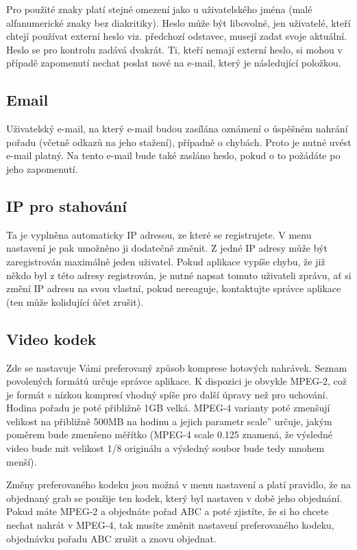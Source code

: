 Pro použité znaky platí stejné omezení jako u uživatelského jména (malé alfanumerické znaky bez diakritiky). Heslo může být libovolné, jen uživatelé, kteří chtejí používat externí heslo viz. předchozí odstavec, musejí zadat svoje aktuální. Heslo se pro kontrolu zadává dvakrát. Ti, kteří nemají externí heslo, si mohou v případě zapomenutí nechat poslat nové na e-mail, který je následující položkou.

\subsection{Email}

Uživatelský e-mail, na který e-mail budou zasílána oznámení o úspěšném nahrání pořadu (včetně odkazů na jeho stažení), případně o chybách. Proto je nutné uvést e-mail platný. Na tento e-mail bude také zasláno heslo, pokud o to požádáte po jeho zapomenutí.
\vfil
\pagebreak
\subsection{IP pro stahování}

Ta je vyplněna automaticky IP adresou, ze které se registrujete. V menu nastavení je pak umožněno ji dodatečně změnit. Z jedné IP adresy může být zaregistrován maximálně jeden uživatel. Pokud aplikace vypíše chybu, že již někdo byl z této adresy registrován, je nutné napsat tomuto uživateli zprávu, ať si změní IP adresu na svou vlastní, pokud nereaguje, kontaktujte správce aplikace (ten může kolidující účet zrušit).

\subsection{Video kodek}

Zde se nastavuje Vámi preferovaný způsob komprese hotových nahrávek. Seznam povolených formátů určuje správce aplikace. K dispozici je obvykle MPEG-2, což je formát s nízkou kompresí vhodný spíše pro další úpravy než pro uchování. Hodina pořadu je poté přibližně 1GB velká. MPEG-4 varianty poté zmenšují velikost na přibližně 500MB na hodinu a jejich parametr \quotedblbase scale'' určuje, jakým poměrem bude zmenšeno měřítko (MPEG-4 scale 0.125 znamená, že výsledné video bude mit velikost 1/8 originálu a výsledný soubor bude tedy mnohem menší).

Změny preferovaného kodeku jsou možná v menu nastavení a platí pravidlo, že na objednaný grab se použije ten kodek, který byl nastaven v době jeho objednání. Pokud máte MPEG-2 a objednáte pořad ABC a poté zjistíte, že si ho chcete nechat nahrát v MPEG-4, tak musíte změnit nastavení preferovaného kodeku, objednávku pořadu ABC zrušit a znovu objednat.

